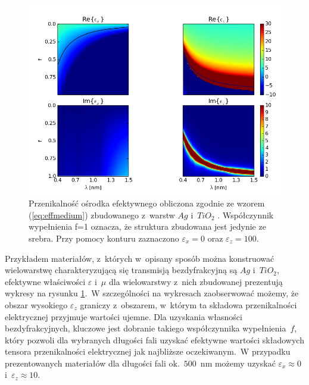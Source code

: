 \begin{figure}[tbh]
	\includegraphics[width=\textwidth]{images/multilayer/agtio2-effective.png}
	\caption{Przenikalność ośrodka efektywnego obliczona zgodnie ze wzorem (\ref{eq:effmedium})  zbudowanego z~warstw $Ag$ \cite{PhysRevB.6.4370} i~$TiO_2$ \cite{DEVORE:51}. Współczynnik wypełnienia f=1 oznacza, że struktura zbudowana jest jedynie ze srebra. Przy pomocy konturu zaznaczono $\varepsilon_x=0$ oraz $\varepsilon_z=100$.}
	\label{fig:multiex}
\end{figure}

Przykładem materiałów, z~których w~opisany sposób można konstruować wielowarstwę charakteryzującą się transmisją bezdyfrakcyjną są $Ag$ i~$TiO_2$, efektywne właściwości $\varepsilon$ i~$\mu$ dla wielowarstwy z~nich zbudowanej prezentują wykresy na rysunku \ref{fig:multiex}.~W szczególności na wykresach zaobserwować możemy, że obszar wysokiego $\varepsilon_z$ graniczy z~obszarem, w~którym ta składowa przenikalności elektrycznej przyjmuje wartości ujemne. Dla uzyskania własności bezdyfrakcyjnych, kluczowe jest dobranie takiego współczynnika wypełnienia~$f$, który pozwoli dla wybranych długości fali uzyskać efektywne wartości składowych tensora przenikalności elektrycznej jak najbliższe oczekiwanym.~W przypadku prezentowanych materiałów dla długości fali ok.~$500$~nm możemy uzyskać $\varepsilon_x \approx 0$ i~$\varepsilon_z \approx 10$.








